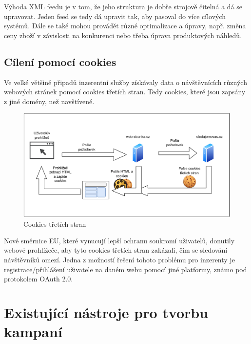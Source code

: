 Výhoda XML feedu je v tom, že jeho struktura je dobře strojově čitelná a dá se upravovat. Jeden feed se tedy dá upravit tak, aby pasoval do více
cílových systémů. Dále se také mohou provádět různé optimalizace a úpravy, např. změna ceny zboží v závislosti na konkurenci nebo třeba úprava produktových náhledů.

\subsection{Cílení pomocí cookies}
Ve velké většině připadů inzerentní služby získávaly data o návštěvnících různých webových stránek pomocí cookies třetích stran. Tedy cookies, které
jsou zapsány z jiné domény, než navštívené. 
\begin{figure}[h]
    \includegraphics[width=1.0\textwidth]{Figures/cookies.drawio.pdf}
    \caption{Cookies třetích stran}
    \label{fig:cookies}
\end{figure}
Nové směrnice EU, které vynucují lepší ochranu soukromí uživatelů, donutily webové prohlížeče, aby tyto cookies třetích stran zakázali, čím se sledování
návštěvníků omezí. Jedna z možností řešení tohoto problému pro inzerenty je registrace/přihlášení uživatele na daném webu pomocí jiné platformy, známo pod protokolem
OAuth 2.0.

\section{Existující nástroje pro tvorbu kampaní}

